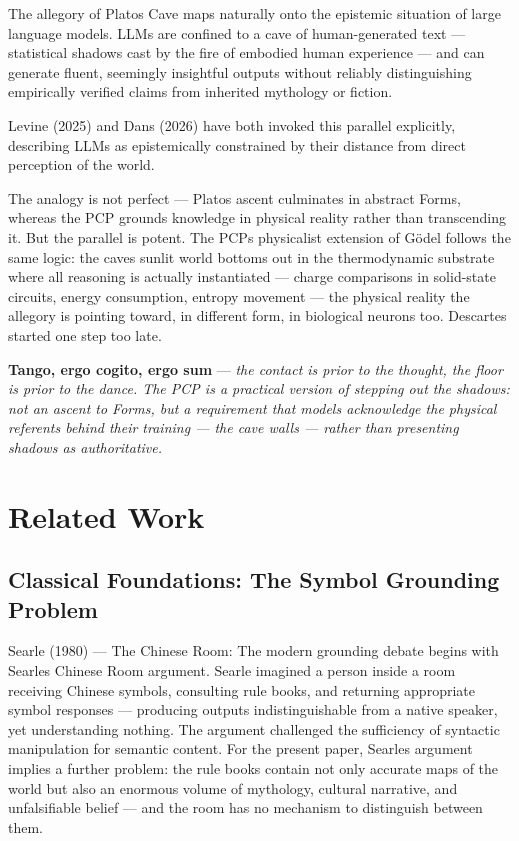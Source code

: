 \documentclass[12pt]{article}
\begin{document}
The allegory of Plato\textquotesingle s Cave maps naturally onto the
epistemic situation of large language models. LLMs are confined to a
cave of human-generated text --- statistical shadows cast by the fire of
embodied human experience --- and can generate fluent, seemingly
insightful outputs without reliably distinguishing empirically verified
claims from inherited mythology or fiction.

Levine (2025) and Dans (2026) have both invoked this parallel
explicitly, describing LLMs as epistemically constrained by their
distance from direct perception of the world.

The analogy is not perfect --- Plato\textquotesingle s ascent culminates
in abstract Forms, whereas the PCP grounds knowledge in physical reality
rather than transcending it. But the parallel is potent. The
PCP\textquotesingle s physicalist extension of Gödel follows the same
logic: the cave\textquotesingle s sunlit world bottoms out in the
thermodynamic substrate where all reasoning is actually instantiated ---
charge comparisons in solid-state circuits, energy consumption, entropy
movement --- the physical reality the allegory is pointing toward, in
different form, in biological neurons too. Descartes started one step
too late.

\textbf{Tango, ergo cogito, ergo sum} --- \emph{the contact is prior to
the thought, the floor is prior to the dance. The PCP is a practical
version of stepping out the shadows: not an ascent to Forms, but a
requirement that models acknowledge the physical referents behind their
training --- the cave walls --- rather than presenting shadows as
authoritative.}

\section{Related Work}\label{appendix-b-related-work}

\subsection{Classical Foundations: The Symbol Grounding Problem}\label{b.1-classical-foundations-the-symbol-grounding-problem}

Searle (1980) --- The Chinese Room: The modern grounding debate begins
with Searle\textquotesingle s Chinese Room argument. Searle imagined a
person inside a room receiving Chinese symbols, consulting rule books,
and returning appropriate symbol responses --- producing outputs
indistinguishable from a native speaker, yet understanding nothing. The
argument challenged the sufficiency of syntactic manipulation for
semantic content. For the present paper, Searle\textquotesingle s
argument implies a further problem: the rule books contain not only
accurate maps of the world but also an enormous volume of mythology,
cultural narrative, and unfalsifiable belief --- and the room has no
mechanism to distinguish between them.
\end{document}
